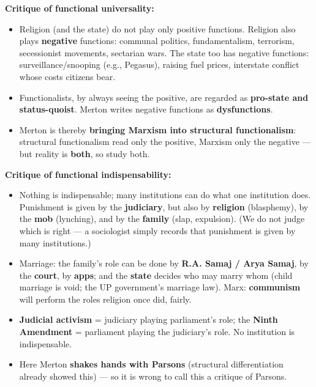 \begin{CriticalPoint}
\textbf{Critique of functional universality:}
\begin{itemize}
\item Religion (and the state) do not play only positive functions. Religion also plays \textbf{negative} functions: communal politics, fundamentalism, terrorism, secessionist movements, sectarian wars. The state too has negative functions: surveillance/snooping (e.g., Pegasus), raising fuel prices, interstate conflict whose costs citizens bear.
\item Functionalists, by always seeing the positive, are regarded as \textbf{pro-state and status-quoist}. Merton writes negative functions as \textbf{dysfunctions}.
\item Merton is thereby \textbf{bringing Marxism into structural functionalism}: structural functionalism read only the positive, Marxism only the negative --- but reality is \textbf{both}, so study both.
\end{itemize}
\end{CriticalPoint}

\begin{CriticalPoint}
\textbf{Critique of functional indispensability:}
\begin{itemize}
\item Nothing is indispensable; many institutions can do what one institution does. Punishment is given by the \textbf{judiciary}, but also by \textbf{religion} (blasphemy), by the \textbf{mob} (lynching), and by the \textbf{family} (slap, expulsion). (We do not judge which is right --- a sociologist simply records that punishment is given by many institutions.)
\item Marriage: the family's role can be done by \textbf{R.A. Samaj / Arya Samaj}, by the \textbf{court}, by \textbf{apps}; and the \textbf{state} decides who may marry whom (child marriage is void; the UP government's marriage law). Marx: \textbf{communism} will perform the roles religion once did, fairly.
\item \textbf{Judicial activism} = judiciary playing parliament's role; the \textbf{Ninth Amendment} = parliament playing the judiciary's role. No institution is indispensable.
\item Here Merton \textbf{shakes hands with Parsons} (structural differentiation already showed this) --- so it is wrong to call this a critique of Parsons.
\end{itemize}
\end{CriticalPoint}

